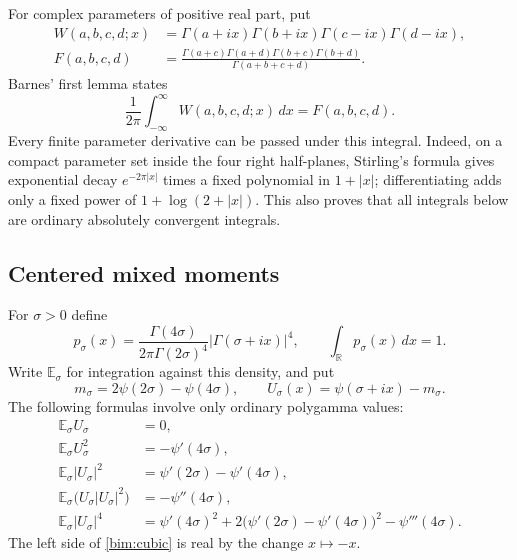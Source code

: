 \documentclass[11pt,a4paper]{article}
\numberwithin{equation}{section}
\theoremstyle{definition}
\theoremstyle{remark}
\begin{document}
For complex parameters of positive real part, put
\begin{align}
 W(a,b,c,d;x)&=\Gamma(a+ix)\Gamma(b+ix)
                  \Gamma(c-ix)\Gamma(d-ix),\\
 F(a,b,c,d)&=\frac{\Gamma(a+c)\Gamma(a+d)
                       \Gamma(b+c)\Gamma(b+d)}
                      {\Gamma(a+b+c+d)}.
\end{align}
Barnes' first lemma states
\begin{equation}\label{bim:barnes}
 \frac1{2\pi}\int_{-\infty}^{\infty}W(a,b,c,d;x)\,dx
                              =F(a,b,c,d).
\end{equation}
Every finite parameter derivative can be passed under this integral.
Indeed, on a compact parameter set inside the four right half-planes,
Stirling's formula gives exponential decay $e^{-2\pi|x|}$ times a
fixed polynomial in $1+|x|$; differentiating adds only a fixed power of
$1+\log(2+|x|)$.  This also proves that all integrals below are ordinary
absolutely convergent integrals.

\subsection{Centered mixed moments}

For $\sigma>0$ define
\begin{equation}\label{bim:density}
 p_\sigma(x)=\frac{\Gamma(4\sigma)}
                   {2\pi\Gamma(2\sigma)^4}
                        |\Gamma(\sigma+ix)|^4,
 \qquad \int_{\mathbb R}p_\sigma(x)\,dx=1.
\end{equation}
Write $\mathbb E_\sigma$ for integration against this density, and put
\begin{equation}\label{bim:center}
 m_\sigma=2\psi(2\sigma)-\psi(4\sigma),\qquad
 U_\sigma(x)=\psi(\sigma+ix)-m_\sigma.
\end{equation}
The following formulas involve only ordinary polygamma values:
\begin{align}
 \mathbb E_\sigma U_\sigma&=0,\label{bim:mean}\\
 \mathbb E_\sigma U_\sigma^2&=-\psi'(4\sigma),
                                               \label{bim:square}\\
 \mathbb E_\sigma|U_\sigma|^2
          &=\psi'(2\sigma)-\psi'(4\sigma),      \label{bim:abs-square}\\
 \mathbb E_\sigma\bigl(U_\sigma|U_\sigma|^2\bigr)
          &=-\psi''(4\sigma),                  \label{bim:cubic}\\
 \mathbb E_\sigma|U_\sigma|^4
          &=\psi'(4\sigma)^2
             +2\bigl(\psi'(2\sigma)-\psi'(4\sigma)\bigr)^2
             -\psi'''(4\sigma).                \label{bim:fourth}
\end{align}
The left side of \eqref{bim:cubic} is real by the change $x\mapsto-x$.
\end{document}
